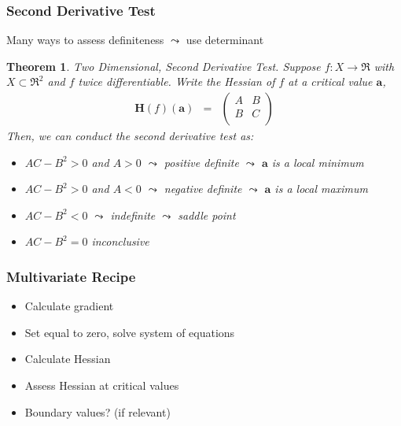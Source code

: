 \documentclass{beamer}
\newtheorem{thm}{Theorem}
\numberwithin{equation}{section}
\begin{document}
\begin{frame}
\frametitle{Second Derivative Test} 

Many ways to assess definiteness $\leadsto$ use determinant 

\begin{thm} 
\alert{Two Dimensional, Second Derivative Test}.  Suppose $f:X \rightarrow \Re$ with $X \subset \Re^{2}$ and $f$ twice differentiable.  Write the \alert{Hessian} of $f$ at a critical value $\boldsymbol{a}$, 
\begin{eqnarray}
\boldsymbol{H}(f)(\boldsymbol{a}) & = & \begin{pmatrix} 
	A & B \\
	B & C \\
	\end{pmatrix} \nonumber 
	\end{eqnarray}
Then, we can conduct the second derivative test as:
\begin{itemize}
\item[-] $AC - B^2> 0$ and $A>0$ $\leadsto$ \alert{positive definite} $\leadsto$ $\boldsymbol{a}$ is a local minimum 
\item[-] $AC - B^2> 0 $ and $A<0$ $\leadsto$ \alert{negative definite} $\leadsto$ $\boldsymbol{a}$ is a local maximum
\item[-] $AC - B^2<0 $ $\leadsto$ \alert{indefinite} $\leadsto$ saddle point 
\item[-] $AC- B^2 = 0$ \alert{inconclusive}
\end{itemize}
	
\end{thm}


\end{frame}


\begin{frame}
\frametitle{Multivariate Recipe}

\begin{itemize}
\item[1)] Calculate \alert{gradient}
\item[2)] Set equal to zero, solve system of equations
\item[3)] Calculate \alert{Hessian}
\item[4)] Assess \alert{Hessian} at critical values
\item[5)] \alert{Boundary values}?  (if relevant)
\end{itemize}


\end{frame}
\end{document}
